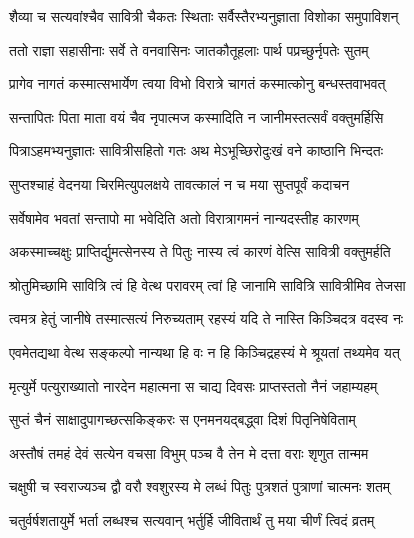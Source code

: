 \twolineshloka
{शैव्या च सत्यवांश्चैव सावित्री चैकतः स्थिताः}
{सर्वैस्तैरभ्यनुज्ञाता विशोका समुपाविशन्}


\twolineshloka
{ततो राज्ञा सहासीनाः सर्वे ते वनवासिनः}
{जातकौतूहलाः पार्थ पप्रच्छुर्नृपतेः सुतम्}


\twolineshloka
{प्रागेव नागतं कस्मात्सभार्येण त्वया विभो}
{विरात्रे चागतं कस्मात्कोनु बन्धस्तवाभवत्}


\twolineshloka
{सन्तापितः पिता माता वयं चैव नृपात्मज}
{कस्मादिति न जानीमस्तत्सर्वं वक्तुमर्हिसि}




\twolineshloka
{पित्राऽहमभ्यनुज्ञातः सावित्रीसहितो गतः}
{अथ मेऽभूच्छिरोदुःखं वने काष्ठानि भिन्दतः}


\twolineshloka
{सुप्तश्चाहं वेदनया चिरमित्युपलक्षये}
{तावत्कालं न च मया सुप्तपूर्वं कदाचन}


\twolineshloka
{सर्वेषामेव भवतां सन्तापो मा भवेदिति}
{अतो विरात्रागमनं नान्यदस्तीह कारणम्}




\twolineshloka
{अकस्माच्चक्षुः प्राप्तिर्द्युमत्सेनस्य ते पितुः}
{नास्य त्वं कारणं वेत्सि सावित्री वक्तुमर्हति}


\twolineshloka
{श्रोतुमिच्छामि सावित्रि त्वं हि वेत्थ परावरम्}
{त्वां हि जानामि सावित्रि सावित्रीमिव तेजसा}


\twolineshloka
{त्वमत्र हेतुं जानीषे तस्मात्सत्यं निरुच्यताम्}
{रहस्यं यदि ते नास्ति किञ्चिदत्र वदस्व नः}




\twolineshloka
{एवमेतद्यथा वेत्थ सङ्कल्पो नान्यथा हि वः}
{न हि किञ्चिद्रहस्यं मे श्रूयतां तथ्यमेव यत्}


\twolineshloka
{मृत्युर्मे पत्युराख्यातो नारदेन महात्मना}
{स चाद्य दिवसः प्राप्तस्ततो नैनं जहाम्यहम्}


\twolineshloka
{सुप्तं चैनं साक्षादुपागच्छत्सकिङ्करः}
{स एनमनयद्बद्ध्वा दिशं पितृनिषेविताम्}


\twolineshloka
{अस्तौषं तमहं देवं सत्येन वचसा विभुम्}
{पञ्च वै तेन मे दत्ता वराः शृणुत तान्मम}


\twolineshloka
{चक्षुषी च स्वराज्यञ्च द्वौ वरौ श्वशुरस्य मे}
{लब्धं पितुः पुत्रशतं पुत्राणां चात्मनः शतम्}


\twolineshloka
{चतुर्वर्षशतायुर्मे भर्ता लब्धश्च सत्यवान्}
{भर्तुर्हि जीवितार्थं तु मया चीर्णं त्विदं व्रतम्}



